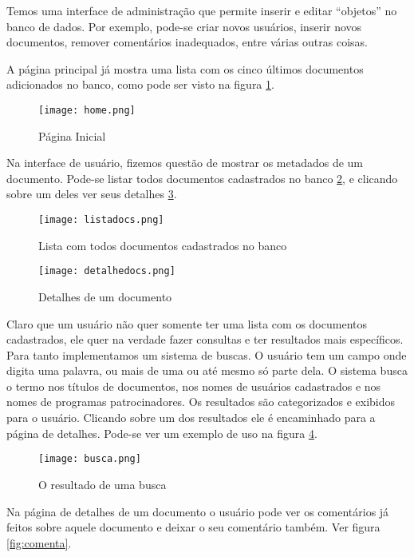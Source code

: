 \documentclass[12pt,a4paper]{article}
\begin{document}
Temos uma interface de administração que permite inserir e editar ``objetos'' no banco de dados. Por exemplo, pode-se
criar novos usuários, inserir novos documentos, remover comentários inadequados, entre várias outras coisas.

A página principal já mostra uma lista com os cinco últimos documentos adicionados no banco, como pode ser visto na figura \ref{fig:home}.

\begin{figure}[h]
  \centering
    \texttt{[image: home.png]}
    \caption{Página Inicial}
    \label{fig:home}
\end{figure}

Na interface de usuário, fizemos questão de mostrar os metadados de um documento. Pode-se listar todos documentos
cadastrados no banco \ref{fig:listadocs}, e clicando sobre um deles ver seus detalhes \ref{fig:detalhedocs}.

\begin{figure}[h]
  \centering
    \texttt{[image: listadocs.png]}
    \caption{Lista com todos documentos cadastrados no banco}
    \label{fig:listadocs}
\end{figure}

\begin{figure}[h]
  \centering
    \texttt{[image: detalhedocs.png]}
    \caption{Detalhes de um documento}
    \label{fig:detalhedocs}
\end{figure}

Claro que um usuário não quer somente ter uma lista com os documentos cadastrados, ele quer na verdade fazer 
consultas e ter resultados mais específicos. Para tanto implementamos um sistema de buscas. O usuário tem um
campo onde digita uma palavra, ou mais de uma ou até mesmo só parte dela. O sistema busca o termo nos títulos
de documentos, nos nomes de usuários cadastrados e nos nomes de programas patrocinadores. Os resultados são 
categorizados e exibidos para o usuário. Clicando sobre um dos resultados ele é encaminhado para a página de 
detalhes. Pode-se ver um exemplo de uso na figura \ref{fig:busca}.

\begin{figure}[h]
  \centering
    \texttt{[image: busca.png]}
    \caption{O resultado de uma busca}
    \label{fig:busca}
\end{figure}

Na página de detalhes de um documento o usuário pode ver os comentários já feitos sobre aquele documento
e deixar o seu comentário também. Ver figura \ref{fig:comenta}.
\end{document}
